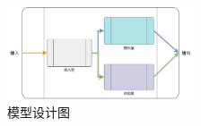 \begin{figure}[htbp]
    \centering
    \includegraphics[width=0.49\textwidth]{模型设计图.pdf}
    \caption{模型设计图}
    \label{fig:模型设计图}
\end{figure}